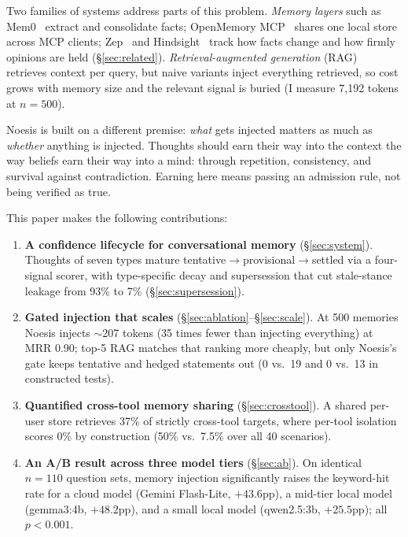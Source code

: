 \documentclass[11pt]{article}
\begin{document}
Two families of systems address parts of this problem. \emph{Memory layers}
such as Mem0~\citep{mem0} extract and consolidate facts; OpenMemory
MCP~\citep{openmemory} shares one local store across MCP clients;
Zep~\citep{zep} and Hindsight~\citep{hindsight} track how facts change and how
firmly opinions are held (\S\ref{sec:related}). \emph{Retrieval-augmented
generation} (RAG)~\citep{lewis2020rag} retrieves context per query, but naive
variants inject everything retrieved, so cost grows with memory size and the
relevant signal is buried (I measure 7{,}192 tokens at $n{=}500$).

Noesis is built on a different premise: \emph{what} gets injected matters as
much as \emph{whether} anything is injected. Thoughts should earn their way
into the context the way beliefs earn their way into a mind: through
repetition, consistency, and survival against contradiction. Earning here
means passing an admission rule, not being verified as true.

This paper makes the following contributions:

\begin{enumerate}
  \item \textbf{A confidence lifecycle for conversational memory}
  (\S\ref{sec:system}). Thoughts of seven types mature
  tentative$\to$\allowbreak provisional$\to$\allowbreak settled via a four-signal scorer, with type-specific decay and supersession that cut
  stale-stance leakage from 93\% to 7\% (\S\ref{sec:supersession}).
  \item \textbf{Gated injection that scales}
  (\S\ref{sec:ablation}--\S\ref{sec:scale}). At 500 memories Noesis injects
  $\sim$207 tokens (35 times fewer than injecting everything) at MRR 0.90; top-5 RAG matches that ranking more cheaply, but only Noesis's
  gate keeps tentative and hedged statements out (0 vs.\ 19
  and 0 vs.\ 13 in constructed tests).
  \item \textbf{Quantified cross-tool memory sharing} (\S\ref{sec:crosstool}).
  A shared per-user store retrieves 37\% of strictly cross-tool targets, where
  per-tool isolation scores 0\% by construction (50\% vs.\ 7.5\% over all 40
  scenarios).
  \item \textbf{An A/B result across three model tiers}
  (\S\ref{sec:ab}). On identical $n{=}110$ question sets, memory injection
  significantly raises the keyword-hit rate for a cloud model (Gemini
  Flash-Lite, $+43.6$pp), a mid-tier local model (gemma3:4b, $+48.2$pp), and
  a small local model (qwen2.5:3b, $+25.5$pp); all $p<0.001$.
\end{enumerate}
\end{document}
